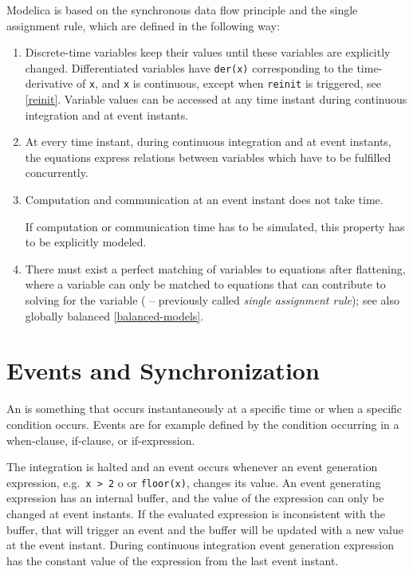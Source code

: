 Modelica is based on the synchronous data flow principle and the single
assignment rule, which are defined in the following way:
\begin{enumerate}
\item Discrete-time variables keep their values until these variables are explicitly changed.
Differentiated variables have \lstinline!der(x)! corresponding to the time-derivative of \lstinline!x!,
and \lstinline!x! is continuous, except when \lstinline!reinit! is triggered, see \cref{reinit}.
Variable values can be accessed at any time instant during continuous integration and at event instants.

\item At every time instant, during continuous integration and at event instants,
the equations express relations between variables which have to be fulfilled concurrently.

\item Computation and communication at an event instant does not take time.
\begin{nonnormative}
If computation or communication time has to be simulated, this property has to be explicitly modeled.
\end{nonnormative}

\item There must exist a perfect matching of variables to equations after flattening, where a variable can only
be matched to equations that can contribute to solving for the variable
( -- previously called \emph{single assignment rule}); see also globally balanced \cref{balanced-models}.
\end{enumerate}

\section{Events and Synchronization}\label{events-and-synchronization}

An  is something that occurs instantaneously at a specific time or when a specific condition occurs.
Events are for example defined by the condition occurring in a when-clause, if-clause, or if-expression.

The integration is halted and an event occurs whenever an event
generation expression, e.g.\ \lstinline!x > 2! o or \lstinline!floor(x)!, changes
its value. An event generating expression has an internal buffer, and
the value of the expression can only be changed at event instants. If
the evaluated expression is inconsistent with the buffer, that will
trigger an event and the buffer will be updated with a new value at the
event instant. During continuous integration event generation expression
has the constant value of the expression from the last event instant.


